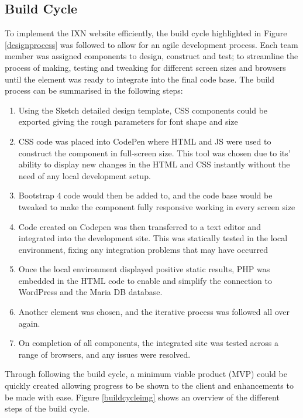 \documentclass[fontsize=11pt]{extarticle}
\numberwithin{figure}{section} %
\numberwithin{table}{section}%
\providecommand{\tightlist}{%
  \setlength{\itemsep}{0pt}\setlength{\parskip}{0pt}}
\begin{document}
\hypertarget{build-cycle}{%
\subsection{Build Cycle}\label{build-cycle}}

To implement the IXN website efficiently, the build cycle highlighted in
Figure \ref{designprocess} was followed to allow for an agile
development process. Each team member was assigned components to design,
construct and test; to streamline the process of making, testing and
tweaking for different screen sizes and browsers until the element was
ready to integrate into the final code base. The build process can be
summarised in the following steps:

\begin{enumerate}

\tightlist
\item
  Using the Sketch detailed design template, CSS components could be
  exported giving the rough parameters for font shape and size
\item
  CSS code was placed into CodePen where HTML and JS were used to
  construct the component in full-screen size. This tool was chosen due
  to its' ability to display new changes in the HTML and CSS instantly
  without the need of any local development setup.
\item
  Bootstrap 4 code would then be added to, and the code base would be
  tweaked to make the component fully responsive working in every screen
  size
\item
  Code created on Codepen was then transferred to a text editor and
  integrated into the development site. This was statically tested in
  the local environment, fixing any integration problems that may have
  occurred
\item
  Once the local environment displayed positive static results, PHP was
  embedded in the HTML code to enable and simplify the connection to
  WordPress and the Maria DB database.
\item
  Another element was chosen, and the iterative process was followed all
  over again.
\item
  On completion of all components, the integrated site was tested across
  a range of browsers, and any issues were resolved.
\end{enumerate}

Through following the build cycle, a minimum viable product (MVP) could
be quickly created allowing progress to be shown to the client and
enhancements to be made with ease. Figure \ref{buildcycleimg} shows an
overview of the different steps of the build cycle.
\end{document}
